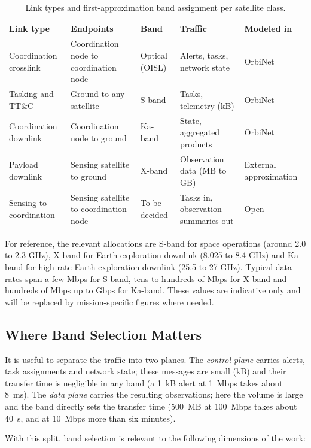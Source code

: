 \documentclass[11pt]{article}
\begin{document}
\begin{table}[h]
\centering
\begin{tabular}{p{2.6cm} p{2.8cm} p{2.2cm} p{2.4cm} p{2.6cm}}
\hline
Link type & Endpoints & Band & Traffic & Modeled in \\
\hline
Coordination crosslink & Coordination node to coordination node & Optical (OISL) & Alerts, tasks, network state & OrbiNet \\
Tasking and TT\&C & Ground to any satellite & S-band & Tasks, telemetry (kB) & OrbiNet \\
Coordination downlink & Coordination node to ground & Ka-band & State, aggregated products & OrbiNet \\
Payload downlink & Sensing satellite to ground & X-band & Observation data (MB to GB) & External approximation \\
Sensing to coordination & Sensing satellite to coordination node & To be decided & Tasks in, observation summaries out & Open \\
\hline
\end{tabular}
\caption{Link types and first-approximation band assignment per satellite class.}
\label{tab:linktypes}
\end{table}

For reference, the relevant allocations are S-band for space operations (around 2.0 to 2.3 GHz), X-band for Earth exploration downlink (8.025 to 8.4 GHz) and Ka-band for high-rate Earth exploration downlink (25.5 to 27 GHz). Typical data rates span a few Mbps for S-band, tens to hundreds of Mbps for X-band and hundreds of Mbps up to Gbps for Ka-band. These values are indicative only and will be replaced by mission-specific figures where needed.

\subsection{Where Band Selection Matters}
\label{subsec:bandrelevance}

It is useful to separate the traffic into two planes. The \emph{control plane} carries alerts, task assignments and network state; these messages are small (kB) and their transfer time is negligible in any band (a 1~kB alert at 1~Mbps takes about 8~ms). The \emph{data plane} carries the resulting observations; here the volume is large and the band directly sets the transfer time (500~MB at 100~Mbps takes about 40~s, and at 10~Mbps more than six minutes).

With this split, band selection is relevant to the following dimensions of the work:
\end{document}
